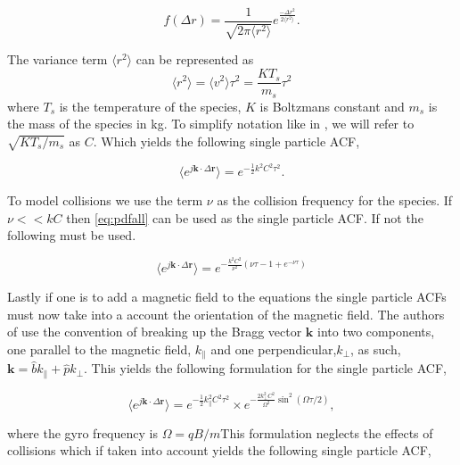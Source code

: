 \documentclass[10pt]{report}
\begin{document}
\begin{equation}
\label{eq:pdfr}
f(\Delta r) = \frac{1}{\sqrt{2\pi \langle r^2 \rangle}}e^{\frac{-\Delta r^2}{2\langle r^2\rangle}}.
\end{equation}
 
\noindent The variance term $\langle r^2 \rangle$ can be represented as
\begin{equation}
\label{eq:var}
\langle r^2 \rangle = \langle v^2 \rangle \tau^2 = \frac{KT_s}{m_s} \tau^2
\end{equation}
 \noindent where $T_s$ is the temperature of the species, $K$ is Boltzmans constant and $m_s$ is the mass of the species in kg. To simplify notation like in \cite{kudeki:milla:1}, we will refer to $\sqrt{KT_s/m_s}$ as $C$. Which yields the following single particle ACF,
 
 \begin{equation}
\label{eq:pdfall}
\langle e^{j\mathbf{k}\cdot\Delta \mathbf{r}}\rangle= e^{-\frac{1}{2}k^2C^2 \tau^2}.
\end{equation}
 
 To model collisions we use the term $\nu$ as the collision frequency for the species. If $\nu<<kC$ then \ref{eq:pdfall} can be used as the single particle ACF. If not the following must be used.
 
 \begin{equation}
 \label{eq:colspacf}
 \langle e^{j\mathbf{k}\cdot\Delta \mathbf{r}}\rangle = e^{-\frac{k^2C^2}{\nu^2}\left( \nu \tau-1+e^{-\nu\tau}\right)}
 \end{equation}
 
Lastly if one is to add a magnetic field to the equations the single particle ACFs must now take into a account the orientation of the magnetic field. The authors of \cite{kudeki:milla:1} use the convention of breaking up the Bragg vector $\mathbf{k}$ into two components, one parallel to the magnetic field, $k_{\parallel}$ and one perpendicular,$k_{\perp}$, as such, $\mathbf{k}= \hat{b}k_{\parallel}+\hat{p}k_{\perp}$. This yields the following formulation for the single particle ACF,

 \begin{equation}
\label{eq:pdfmag}
\langle e^{j\mathbf{k}\cdot\Delta \mathbf{r}}\rangle= e^{-\frac{1}{2}k_{\parallel}^2C^2 \tau^2}\times e^{-\frac{2k_{\perp}^2C^2}{\Omega^2} \sin^2(\Omega\tau/2)},
\end{equation}

\noindent where the gyro frequency is $\Omega = qB/m$This formulation neglects the effects of collisions which if taken into account yields the following single particle ACF,
\end{document}
